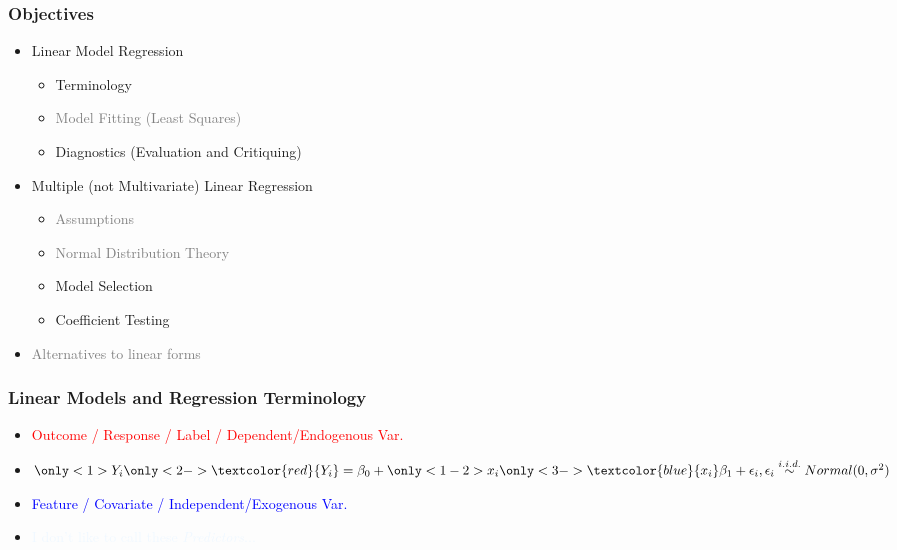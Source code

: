 \documentclass[xcolor={dvipsnames}]{beamer}
\begin{document}
{\begin{columns}
\begin{column}{.4\textwidth}
\end{column}
\end{columns}


}



\frame
{
\normalsize
 \frametitle{Objectives}
\begin{itemize}
\item Linear Model Regression 
\begin{itemize}
\item Terminology 
\item \textcolor{gray}{Model Fitting (Least Squares)} 
\item Diagnostics (Evaluation and Critiquing) 
\end{itemize}
\item Multiple (not Multivariate) Linear Regression
\begin{itemize}
\item \textcolor{gray}{Assumptions}
\item \textcolor{gray}{Normal Distribution Theory}  
\item Model Selection
\item Coefficient Testing
\end{itemize}
\item \textcolor{gray}{Alternatives to linear forms}
\end{itemize}

}



\frame
{
 \frametitle{Linear Models and Regression Terminology}


\vspace{-.25em}
\begin{itemize}
\item[]<2->\textcolor{red}{Outcome / Response / Label / Dependent/Endogenous Var.}
\item $\only<1>{Y_i}\only<2->{\textcolor{red}{Y_i}} = \beta_0  +   \only<1-2>{x_i}\only<3->{\textcolor{blue}{x_i}}\beta_1 + \epsilon_i, \epsilon_i \overset{\tiny i.i.d.}{\sim}  Normal(0,\sigma^2)$
\item[]<3->  \hspace{4.1em}  \textcolor{blue}{Feature / Covariate / Independent/Exogenous Var.}
\item[]<4->  \hspace{4.1em}   \textcolor{aliceblue}{ I don't like to call these \emph{Predictors}...}
\vspace{30em}${}$\\

\end{itemize}

}
\end{document}
